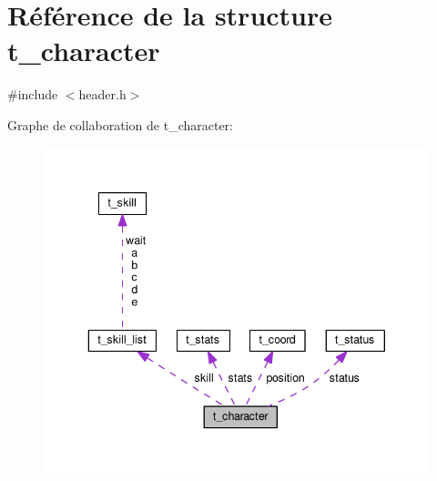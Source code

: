 \hypertarget{structt__character}{\section{Référence de la structure t\+\_\+character}
\label{structt__character}
}


{\ttfamily \#include $<$header.\+h$>$}



Graphe de collaboration de t\+\_\+character\+:
\nopagebreak
\begin{figure}[H]
\begin{center}
\leavevmode
\includegraphics[width=343pt]{structt__character__coll__graph}
\end{center}
\end{figure}
